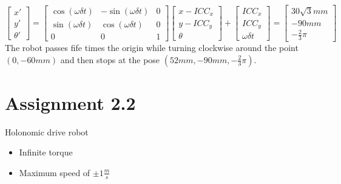 \documentclass[paper=a4, fontsize=11pt]{scrartcl} %
\begin{document}
\begin{equation}
    \begin{bmatrix}
        x'\\
        y'\\
        \theta'
    \end{bmatrix}
    = \begin{bmatrix}
        \cos(\omega \delta t) & -\sin(\omega \delta t) & 0\\
        \sin(\omega \delta t) & \cos(\omega \delta t) & 0\\
        0 & 0 & 1
    \end{bmatrix}
    \begin{bmatrix}
        x - ICC_x\\
        y - ICC_y\\
        \theta
    \end{bmatrix}
    + \begin{bmatrix}
        ICC_x\\
        ICC_y\\
        \omega \delta t
    \end{bmatrix}
    = \begin{bmatrix}
        30\sqrt 3 mm\\
        -90 mm\\
        -\frac{2}{3} \pi
    \end{bmatrix}
\end{equation}
The robot passes fife times the origin while turning clockwise around the point
$ (0, -60 mm) $ and then stops at the pose $ (52 mm, -90 mm, -\frac{2}{3} \pi)
$.


\section{Assignment 2.2}

Holonomic drive robot
\begin{itemize}
\item Infinite torque
\item Maximum speed of $ \pm 1 \frac{m}{s} $
\end{itemize}
\end{document}
